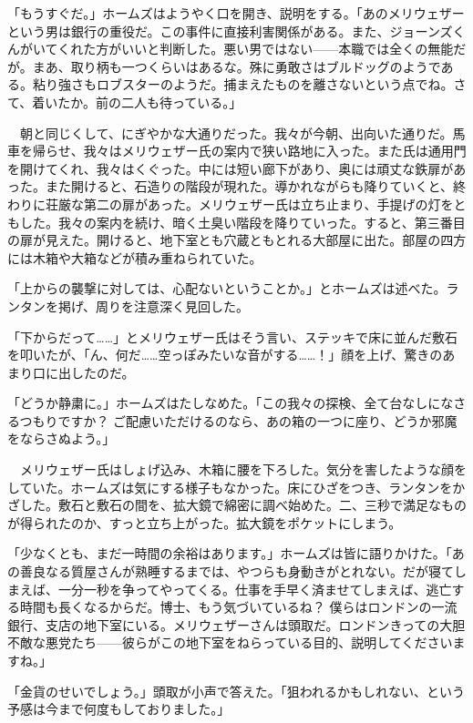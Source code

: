 \documentclass[tate,paper=b6j,jafontsize=9pt]{jlreq}
\begin{document}
「もうすぐだ。」ホームズはようやく口を開き、説明をする。「あのメリウェザーという男は銀行の重役だ。この事件に直接利害関係がある。また、ジョーンズくんがいてくれた方がいいと判断した。悪い男ではない------本職では全くの無能だが。まあ、取り柄も一つくらいはあるな。殊に勇敢さはブルドッグのようである。粘り強さもロブスターのようだ。捕まえたものを離さないという点でね。さて、着いたか。前の二人も待っている。」

　朝と同じくして、にぎやかな大通りだった。我々が今朝、出向いた通りだ。馬車を帰らせ、我々はメリウェザー氏の案内で狭い路地に入った。また氏は通用門を開けてくれ、我々はくぐった。中には短い廊下があり、奥には頑丈な鉄扉があった。また開けると、石造りの階段が現れた。導かれながらも降りていくと、終わりに荘厳な第二の扉があった。メリウェザー氏は立ち止まり、手提げの灯をともした。我々の案内を続け、暗く土臭い階段を降りていった。すると、第三番目の扉が見えた。開けると、地下室とも穴蔵ともとれる大部屋に出た。部屋の四方には木箱や大箱などが積み重ねられていた。


「上からの襲撃に対しては、心配ないということか。」とホームズは述べた。ランタンを掲げ、周りを注意深く見回した。

「下からだって……」とメリウェザー氏はそう言い、ステッキで床に並んだ敷石を叩いたが、「ん、何だ……空っぽみたいな音がする……！」顔を上げ、驚きのあまり口に出したのだ。

「どうか静粛に。」ホームズはたしなめた。「この我々の探検、全て台なしになさるつもりですか？ ご配慮いただけるのなら、あの箱の一つに座り、どうか邪魔をならさぬよう。」

　メリウェザー氏はしょげ込み、木箱に腰を下ろした。気分を害したような顔をしていた。ホームズは気にする様子もなかった。床にひざをつき、ランタンをかざした。敷石と敷石の間を、拡大鏡で綿密に調べ始めた。二、三秒で満足なものが得られたのか、すっと立ち上がった。拡大鏡をポケットにしまう。

「少なくとも、まだ一時間の余裕はあります。」ホームズは皆に語りかけた。「あの善良なる質屋さんが熟睡するまでは、やつらも身動きがとれない。だが寝てしまえば、一分一秒を争ってやってくる。仕事を手早く済ませてしまえば、逃亡する時間も長くなるからだ。博士、もう気づいているね？ 僕らはロンドンの一流銀行、支店の地下室にいる。メリウェザーさんは頭取だ。ロンドンきっての大胆不敵な悪党たち------彼らがこの地下室をねらっている目的、説明してくださいますね。」

「金貨のせいでしょう。」頭取が小声で答えた。「狙われるかもしれない、という予感は今まで何度もしておりました。」
\end{document}
